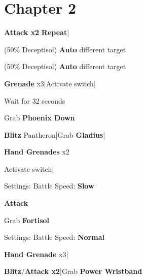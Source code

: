 \section{Chapter 2}

\begin{mainlist}
	\item {}
	\item {} \textbf{Attack x2} \to \textbf{Repeat}|\skip
	\item {} (50\% Deceptisol) \textbf{Auto} different target
	\item {} (50\% Deceptisol) \textbf{Auto} different target
	\item {}
	\item {} \textbf{Grenade} x3|Activate switch|
	\item {} Wait for 32 seconds
	\item Grab \textbf{Phoenix Down}
	\item {} \textbf{Blitz} Pantheron|Grab \textbf{Gladius}|
	\item {} \textbf{Hand Grenades} x2
	\item Activate switch|\skip
\end{mainlist}

\begin{menu}
	\item Settings: Battle Speed: \textbf{Slow}
\end{menu}

\begin{mainlist}
	\item {}
	\item {} \textbf{Attack} 
	\item Grab \textbf{Fortisol}
\end{mainlist}

\begin{menu}
	\item Settings: Battle Speed: \textbf{Normal}
\end{menu}

\begin{mainlist}
	\item \skip
	\item {} \textbf{Hand Grenade} x3|
	\item {} \textbf{Blitz}/\textbf{Attack x2}|Grab \textbf{Power Wristband}
\end{mainlist}

